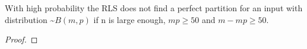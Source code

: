 \begin{lemma}
    With high probability the RLS does not find a perfect partition for an input with distribution \textasciitilde$B(m,p)$ if n is large enough, $mp\ge50$ and $m-mp\ge50$.
\end{lemma}
\begin{proof}


\end{proof}
